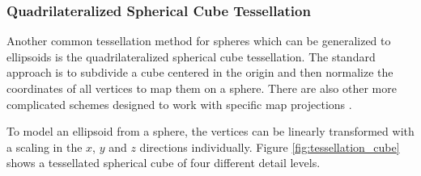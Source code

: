 \subsubsection{Quadrilateralized Spherical Cube Tessellation}
 
Another common tessellation method for spheres which can be generalized to ellipsoids is the quadrilateralized spherical cube tessellation. The standard approach is to subdivide a cube centered in the origin and then normalize the coordinates of all vertices to map them on a sphere. There are also other more complicated schemes designed to work with specific map projections \cite{dimi15}.

To model an ellipsoid from a sphere, the vertices can be linearly transformed with a scaling in the $x$, $y$ and $z$ directions individually. Figure \ref{fig:tessellation_cube} shows a tessellated spherical cube of four different detail levels.

